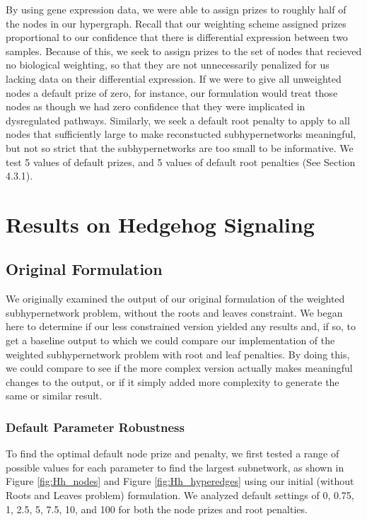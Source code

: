 \documentclass[12pt,twoside]{reedthesis}
\theoremstyle{definition}
\begin{document}
   By using gene expression data, we were able to assign prizes to roughly half of the nodes in our hypergraph. Recall that our weighting scheme assigned prizes proportional to our confidence that there is differential expression between two samples. Because of this, we seek to assign prizes to the set of nodes that recieved no biological weighting, so that they are not unnecessarily penalized for us lacking data on their differential expression. If we were to give all unweighted nodes a default prize of zero, for instance, our formulation would treat those nodes as though we had zero confidence that they were implicated in dysregulated pathways. Similarly, we seek a default root penalty to apply to all nodes that sufficiently large to make reconstucted subhypernetworks meaningful, but not so strict that the subhypernetworks are too small to be informative. We test 5 values of default prizes, and 5 values of default root penalties (See Section 4.3.1).\par

   \section{Results on Hedgehog Signaling}

   \subsection{Original Formulation}

   We originally examined the output of our original formulation of the weighted subhypernetwork problem, without the roots and leaves constraint. We began here to determine if our less constrained version yielded any results and, if so, to get a baseline output to which we could compare our implementation of the weighted subhypernetwork problem with root and leaf penalties. By doing this, we could compare to see if the more complex version actually makes meaningful changes to the output, or if it simply added more complexity to generate the same or similar result.

   \subsubsection{Default Parameter Robustness}

   To find the optimal default node prize and penalty, we first tested a range of possible values for each parameter to find the largest subnetwork, as shown in Figure \ref{fig:Hh_nodes} and Figure \ref{fig:Hh_hyperedges} using our initial (without Roots and Leaves problem) formulation. We analyzed default settings of 0, 0.75, 1, 2.5, 5, 7.5, 10, and 100 for both the node prizes and root penalties. \par
\end{document}
